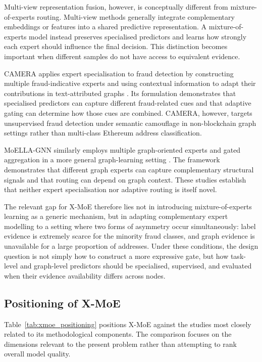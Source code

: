 \documentclass{ieeeaccess}
\begin{document}
Multi-view representation fusion, however, is conceptually different from mixture-of-experts routing. Multi-view methods generally integrate complementary embeddings or features into a shared predictive representation. A mixture-of-experts model instead preserves specialised predictors and learns how strongly each expert should influence the final decision. This distinction becomes important when different samples do not have access to equivalent evidence.

CAMERA applies expert specialisation to fraud detection by constructing multiple fraud-indicative experts and using contextual information to adapt their contributions in text-attributed graphs \cite{pan2026camera}. Its formulation demonstrates that specialised predictors can capture different fraud-related cues and that adaptive gating can determine how those cues are combined. CAMERA, however, targets unsupervised fraud detection under semantic camouflage in non-blockchain graph settings rather than multi-class Ethereum address classification.

MoELLA-GNN similarly employs multiple graph-oriented experts and gated aggregation in a more general graph-learning setting \cite{peng2026moella}. The framework demonstrates that different graph experts can capture complementary structural signals and that routing can depend on graph context. These studies establish that neither expert specialisation nor adaptive routing is itself novel.

The relevant gap for X-MoE therefore lies not in introducing mixture-of-experts learning as a generic mechanism, but in adapting complementary expert modelling to a setting where two forms of asymmetry occur simultaneously: label evidence is extremely scarce for the minority fraud classes, and graph evidence is unavailable for a large proportion of addresses. Under these conditions, the design question is not simply how to construct a more expressive gate, but how task-level and graph-level predictors should be specialised, supervised, and evaluated when their evidence availability differs across nodes.

\subsection{Positioning of X-MoE}

Table~\ref{tab:xmoe_positioning} positions X-MoE against the studies most closely related to its methodological components. The comparison focuses on the dimensions relevant to the present problem rather than attempting to rank overall model quality.
\end{document}
